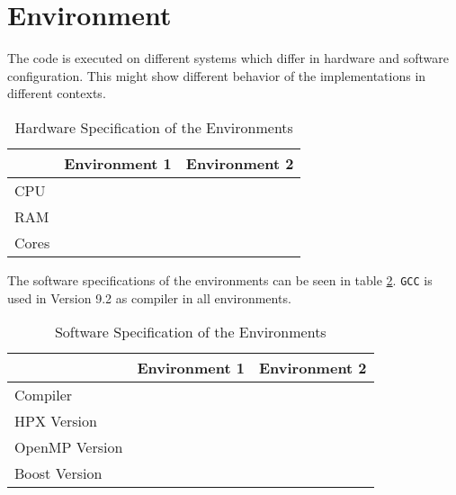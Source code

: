 \section{Environment}
  The code is executed on different systems which differ in hardware and software configuration.
  This might show different behavior of the implementations in different contexts.

\begin{table}
\centering
\caption{Hardware Specification of the Environments}
\begin{tabular}[h]{l c c}
 & Environment 1 & Environment 2 \\\hline
CPU &  &  \\
RAM &  &  \\
Cores &  &  \\\hline
\end{tabular}
\label{tab:hardEnv}
\end{table}

The software specifications of the environments can be seen in table \ref{tab:softEnv}.
\texttt{GCC} is used in Version 9.2 as compiler in all environments.
\begin{table}
\centering
\caption{Software Specification of the Environments}
\begin{tabular}[h]{l c c}
\centering
 & Environment 1 & Environment 2 \\\hline
Compiler &  &  \\
HPX Version &  &  \\
OpenMP Version &  &  \\
Boost Version &  &  \\\hline
\end{tabular}
\label{tab:softEnv}
\end{table}